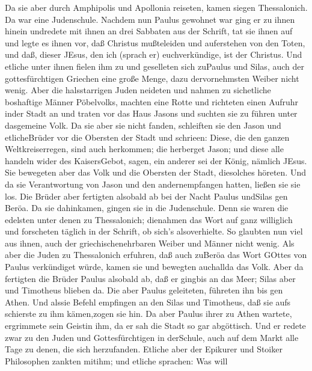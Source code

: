  Da sie aber durch Amphipolis und Apollonia reiseten, kamen
siegen Thessalonich. Da war eine Judenschule.  Nachdem nun
Paulus gewohnet war ging er zu ihnen hinein undredete mit ihnen an drei
Sabbaten aus der Schrift,  tat sie ihnen auf und legte es
ihnen vor, daß Christus mußteleiden und auferstehen von den Toten, und
daß, dieser JEsus, den ich (sprach er) euchverkündige, ist der Christus.
 Und etliche unter ihnen fielen ihm zu und geselleten sich
zuPaulus und Silas, auch der gottesfürchtigen Griechen eine große Menge,
dazu dervornehmsten Weiber nicht wenig.  Aber die
halsstarrigen Juden neideten und nahmen zu sichetliche boshaftige Männer
Pöbelvolks, machten eine Rotte und richteten einen Aufruhr inder Stadt
an und traten vor das Haus Jasons und suchten sie zu führen unter
dasgemeine Volk.  Da sie aber sie nicht fanden, schleiften
sie den Jason und etlicheBrüder vor die Obersten der Stadt und schrieen:
Diese, die den ganzen Weltkreiserregen, sind auch herkommen;
 die herberget Jason; und diese alle handeln wider des
KaisersGebot, sagen, ein anderer sei der König, nämlich JEsus.
 Sie bewegeten aber das Volk und die Obersten der Stadt,
diesolches höreten.  Und da sie Verantwortung von Jason und
den andernempfangen hatten, ließen sie sie los.  Die Brüder
aber fertigten alsobald ab bei der Nacht Paulus undSilas gen Beröa. Da
sie dahinkamen, gingen sie in die Judenschule.  Denn sie
waren die edelsten unter denen zu Thessalonich; dienahmen das Wort auf
ganz williglich und forscheten täglich in der Schrift, ob sich's
alsoverhielte.  So glaubten nun viel aus ihnen, auch der
griechischenehrbaren Weiber und Männer nicht wenig.  Als
aber die Juden zu Thessalonich erfuhren, daß auch zuBeröa das Wort
GOttes von Paulus verkündiget würde, kamen sie und bewegten auchallda
das Volk.  Aber da fertigten die Brüder Paulus alsobald ab,
daß er gingbis an das Meer; Silas aber und Timotheus blieben da.
 Die aber Paulus geleiteten, führeten ihn bis gen Athen.
Und alssie Befehl empfingen an den Silas und Timotheus, daß sie aufs
schierste zu ihm kämen,zogen sie hin.  Da aber Paulus ihrer
zu Athen wartete, ergrimmete sein Geistin ihm, da er sah die Stadt so
gar abgöttisch.  Und er redete zwar zu den Juden und
Gottesfürchtigen in derSchule, auch auf dem Markt alle Tage zu denen,
die sich herzufanden.  Etliche aber der Epikurer und
Stoiker Philosophen zankten mitihm; und etliche sprachen: Was will

